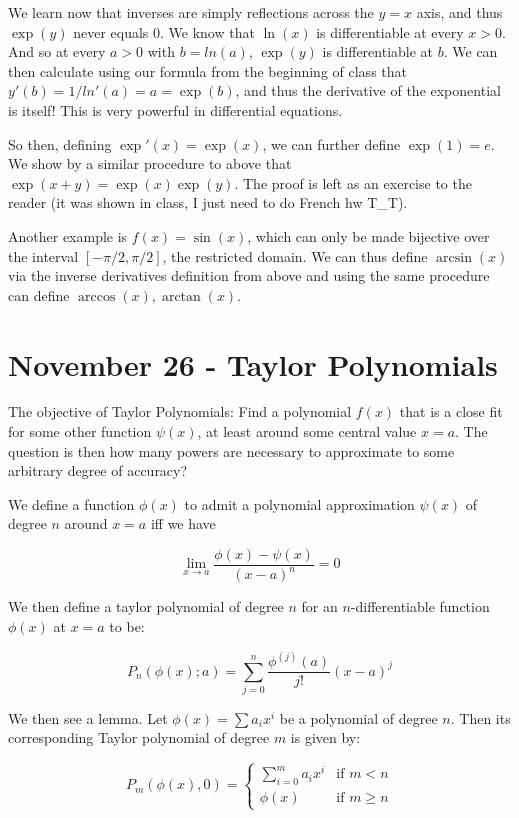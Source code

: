 \documentclass{report}
\begin{document}
We learn now that inverses are simply reflections across the $y=x$ axis, and thus $\exp(y)$ never equals $0$. We know that $\ln(x)$ is differentiable at every $x > 0$. And so at every $a>0$ with $b = ln(a)$, $\exp(y)$ is differentiable at $b$. We can then calculate using our formula from the beginning of class that $y'(b) = 1/ln'(a) = a = \exp(b)$, and thus the derivative of the exponential is itself! This is very powerful in differential equations.

So then, defining $\exp'(x) = \exp(x)$, we can further define $\exp(1) = e$. We show by a similar procedure to above that $\exp(x+y) = \exp(x)\exp(y)$. The proof is left as an exercise to the reader (it was shown in class, I just need to do French hw T\_T). 

Another example is $f(x) = \sin(x)$, which can only be made bijective over the interval $[-\pi/2,\pi/2]$, the restricted domain. We can thus define $\arcsin(x)$ via the inverse derivatives definition from above and using the same procedure can define $\arccos(x), \arctan(x)$.  

\chapter{November 26 - Taylor Polynomials}

The objective of Taylor Polynomials: Find a polynomial $f(x)$ that is a close fit for some other function $\psi(x)$, at least around some central value $x = a$. The question is then how many powers are necessary to approximate to some arbitrary degree of accuracy? 

We define a function $\phi(x)$ to admit a polynomial approximation $\psi(x)$ of degree $n$ around $x=a$ iff we have

$$\lim_{x \to a} \frac{\phi(x) - \psi(x)}{(x-a)^n} = 0$$

We then define a taylor polynomial of degree $n$ for an $n$-differentiable function $\phi(x)$ at $x = a$ to be:

$$P_n(\phi(x);a) = \displaystyle\sum\limits_{j=0}^n{\frac{\phi^{(j)}(a)}{j!}(x-a)^j}$$

We then see a lemma. Let $\phi(x) = \sum a_ix^i$ be a polynomial of degree $n$. Then its corresponding Taylor polynomial of degree $m$ is given by:

$$P_m(\phi(x),0) = \begin{cases}\sum_{i=0}^m a_ix^i & \mbox{if } m < n\\\phi(x) & \mbox{if } m \geq n\end{cases}$$
\end{document}
